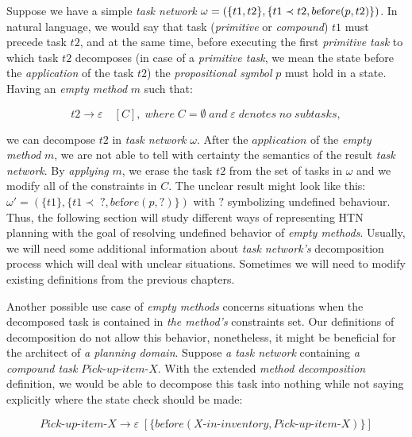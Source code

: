 \begin{example}\label{ex03:6}
    Suppose we have a simple \emph{task network} $\omega = (\{t1, t2\}, \{t1 \prec t2, \\ be\text{f}ore(p, t2)\})$. In natural language, we would say that task (\emph{primitive} or \emph{compound}) $t1$ must precede task $t2$, and at the same time, before executing the first \emph{primitive task} to which task $t2$ decomposes (in case of a \emph{primitive task}, we mean the state before the \emph{application} of the task $t2$) the \emph{propositional symbol} $p$ must hold in a state. Having an \emph{empty method} $m$ such that:
    
    \[
        t2 \rightarrow \varepsilon \quad [C], \; where \; C = \emptyset \; and \; \varepsilon \; denotes \; no \; subtasks,
    \]
    
    \noindent
    we can decompose $t2$ in \emph{task network} $\omega$. After the $application$ of the \emph{empty method} $m$, we are not able to tell with certainty the semantics of the result \emph{task network}. By \emph{applying} $m$, we erase the task $t2$ from the set of tasks in $\omega$ and we modify all of the constraints in $C$. The unclear result might look like this: $\omega' = (\{t1\}, \{t1 \prec \; ?, be\text{f}ore(p, ?)\})$ with $?$ symbolizing undefined behaviour. Thus, the following section will study different ways of representing HTN planning with the goal of resolving undefined behavior of \emph{empty methods}. Usually, we will need some additional information about \emph{task network's} decomposition process which will deal with unclear situations. Sometimes we will need to modify existing definitions from the previous chapters.
\end{example}

\medskip\noindent
Another possible use case of \emph{empty methods} concerns situations when the decomposed task is contained in \emph{the method's} constraints set. Our definitions of decomposition do not allow this behavior, nonetheless, it might be beneficial for the architect of \emph{a planning domain}. Suppose \emph{a task network} containing \emph{a compound task} $Pick\text{-}up\text{-}item\text{-}X$. With the extended \emph{method decomposition} definition, we would be able to decompose this task into nothing while not saying explicitly where the state check should be made:

\[
    Pick\text{-}up\text{-}item\text{-}X \rightarrow \varepsilon \; [\{be\text{f}ore(X\text{-}in\text{-}inventory, Pick\text{-}up\text{-}item\text{-}X)\}]
\]

